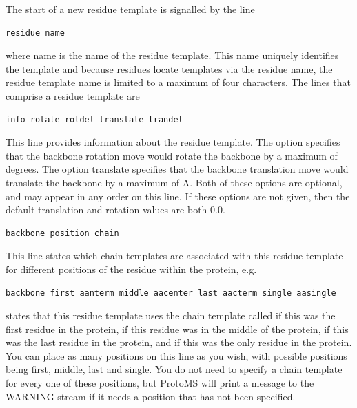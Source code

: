 \documentclass[letterpaper,10pt,english]{sphinxmanual}
\begin{document}
The start of a new residue template is signalled by the line

\begin{Verbatim}[frame=single,commandchars=\\\{\}]
residue name
\end{Verbatim}

where name is the name of the residue template. This name uniquely identifies the template and because residues locate templates via the residue name, the residue template name is limited to a maximum of four characters. The lines that comprise a residue template are

\begin{Verbatim}[frame=single,commandchars=\\\{\}]
info rotate rotdel translate trandel
\end{Verbatim}

This line provides information about the residue template. The option   specifies that the backbone rotation move would rotate the backbone by a maximum of  degrees. The option translate  specifies that the backbone translation move would translate the backbone by a maximum of  A. Both of these options are optional, and may appear in any order on this line. If these options are not given, then the default translation and rotation values are both 0.0.

\begin{Verbatim}[frame=single,commandchars=\\\{\}]
backbone position chain
\end{Verbatim}

This line states which chain templates are associated with this residue template for different positions of the residue within the protein, e.g.

\begin{Verbatim}[frame=single,commandchars=\\\{\}]
backbone first aanterm middle aacenter last aacterm single aasingle
\end{Verbatim}

states that this residue template uses the chain template called  if this was the first residue in the protein,  if this residue was in the middle of the protein,  if this was the last residue in the protein, and  if this was the only residue in the protein. You can place as many positions on this line as you wish, with possible positions being first, middle, last and single. You do not need to specify a chain template for every one of these positions, but ProtoMS will print a message to the WARNING stream if it needs a position that has not been specified.
\end{document}
